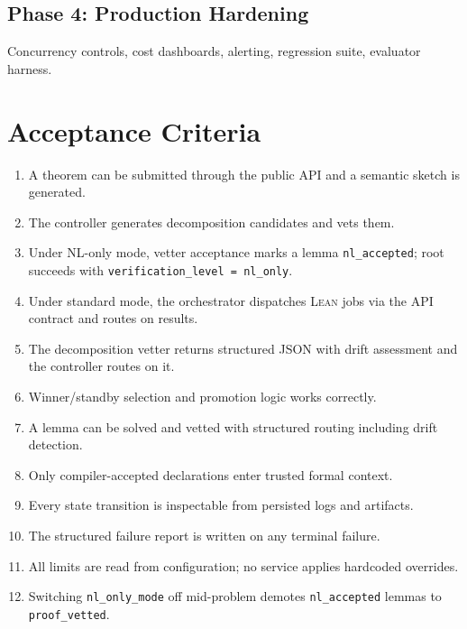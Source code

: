 \documentclass[11pt,a4paper]{article}
\newcommand{\Lean}{\textsc{Lean}}
\begin{document}
\subsection{Phase 4: Production Hardening}
Concurrency controls, cost dashboards, alerting, regression suite, evaluator harness.

\section{Acceptance Criteria}

\begin{enumerate}[leftmargin=2em]
  \item A theorem can be submitted through the public API and a semantic sketch is generated.
  \item The controller generates decomposition candidates and vets them.
  \item Under NL-only mode, vetter acceptance marks a lemma \texttt{nl\_accepted}; root succeeds with \texttt{verification\_level = nl\_only}.
  \item Under standard mode, the orchestrator dispatches \Lean{} jobs via the API contract and routes on results.
  \item The decomposition vetter returns structured JSON with drift assessment and the controller routes on it.
  \item Winner/standby selection and promotion logic works correctly.
  \item A lemma can be solved and vetted with structured routing including drift detection.
  \item Only compiler-accepted declarations enter trusted formal context.
  \item Every state transition is inspectable from persisted logs and artifacts.
  \item The structured failure report is written on any terminal failure.
  \item All limits are read from configuration; no service applies hardcoded overrides.
  \item Switching \texttt{nl\_only\_mode} off mid-problem demotes \texttt{nl\_accepted} lemmas to \texttt{proof\_vetted}.
\end{enumerate}

\appendix
\end{document}
